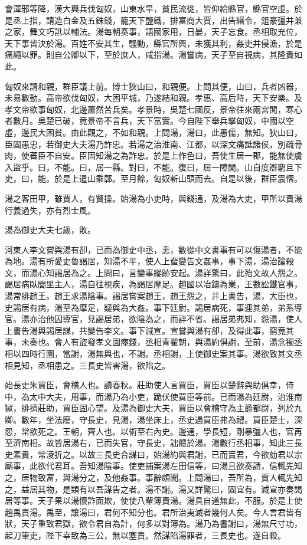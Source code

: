 會渾邪等降，漢大興兵伐匈奴，山東水旱，貧民流徙，皆仰給縣官，縣官空虛。於是丞上指，請造白金及五銖錢，籠天下鹽鐵，排富商大賈，出告緡令，鉏豪彊并兼之家，舞文巧詆以輔法。湯每朝奏事，語國家用，日晏，天子忘食。丞相取充位，天下事皆決於湯。百姓不安其生，騷動，縣官所興，未獲其利，姦吏并侵漁，於是痛繩以罪。則自公卿以下，至於庶人，咸指湯。湯嘗病，天子至自視病，其隆貴如此。

匈奴來請和親，群臣議上前。博士狄山曰，和親便。上問其便，山曰，兵者凶器，未易數動。高帝欲伐匈奴，大困平城，乃遂結和親。孝惠、高后時，天下安樂。及孝文帝欲事匈奴，北邊蕭然苦兵矣。孝景時，吳楚七國反，景帝往來兩宮閒，寒心者數月。吳楚已破，竟景帝不言兵，天下富實。今自陛下舉兵擊匈奴，中國以空虛，邊民大困貧。由此觀之，不如和親。上問湯，湯曰，此愚儒，無知。狄山曰，臣固愚忠，若御史大夫湯乃詐忠。若湯之治淮南、江都，以深文痛詆諸侯，別疏骨肉，使蕃臣不自安。臣固知湯之為詐忠。於是上作色曰，吾使生居一郡，能無使虜入盜乎。曰，不能。曰，居一縣。對曰，不能。復曰，居一障閒。山自度辯窮且下吏，曰，能。於是上遣山乘鄣。至月餘，匈奴斬山頭而去。自是以後，群臣震慴。

湯之客田甲，雖賈人，有賢操。始湯為小吏時，與錢通，及湯為大吏，甲所以責湯行義過失，亦有烈士風。

湯為御史大夫七歲，敗。

河東人李文嘗與湯有卻，已而為御史中丞，恚，數從中文書事有可以傷湯者，不能為地。湯有所愛史魯謁居，知湯不平，使人上蜚變告文姦事，事下湯，湯治論殺文，而湯心知謁居為之。上問曰，言變事縱跡安起。湯詳驚曰，此殆文故人怨之。謁居病臥閭里主人，湯自往視疾，為謁居摩足。趙國以冶鑄為業，王數訟鐵官事，湯常排趙王。趙王求湯陰事。謁居嘗案趙王，趙王怨之，并上書告，湯，大臣也，史謁居有病，湯至為摩足，疑與為大姦。事下廷尉。謁居病死，事連其弟，弟系導官。湯亦治他囚導官，見謁居弟，欲陰為之，而詳不省。謁居弟弗知，怨湯，使人上書告湯與謁居謀，共變告李文。事下減宣。宣嘗與湯有卻，及得此事，窮竟其事，未奏也。會人有盜發孝文園瘞錢，丞相青翟朝，與湯約俱謝，至前，湯念獨丞相以四時行園，當謝，湯無與也，不謝。丞相謝，上使御史案其事。湯欲致其文丞相見知，丞相患之。三長史皆害湯，欲陷之。

始長史朱買臣，會稽人也。讀春秋。莊助使人言買臣，買臣以楚辭與助俱幸，侍中，為太中大夫，用事，而湯乃為小吏，跪伏使買臣等前。已而湯為廷尉，治淮南獄，排擠莊助，買臣固心望。及湯為御史大夫，買臣以會稽守為主爵都尉，列於九卿。數年，坐法廢，守長史，見湯，湯坐床上，丞史遇買臣弗為禮。買臣楚士，深怨，常欲死之。王朝，齊人也。以術至右內史。邊通，學長短，剛暴彊人也，官再至濟南相。故皆居湯右，已而失官，守長史，詘體於湯。湯數行丞相事，知此三長史素貴，常淩折之。以故三長史合謀曰，始湯約與君謝，已而賣君，今欲劾君以宗廟事，此欲代君耳。吾知湯陰事。使吏捕案湯左田信等，曰湯且欲奏請，信輒先知之，居物致富，與湯分之，及他姦事。事辭頗聞。上問湯曰，吾所為，賈人輒先知之，益居其物，是類有以吾謀告之者。湯不謝。湯又詳驚曰，固宜有。減宣亦奏謁居等事。天子果以湯懷詐面欺，使使八輩簿責湯。湯具自道無此，不服。於是上使趙禹責湯。禹至，讓湯曰，君何不知分也。君所治夷滅者幾何人矣。今人言君皆有狀，天子重致君獄，欲令君自為計，何多以對簿為。湯乃為書謝曰，湯無尺寸功，起刀筆吏，陛下幸致為三公，無以塞責。然謀陷湯罪者，三長史也。遂自殺。

